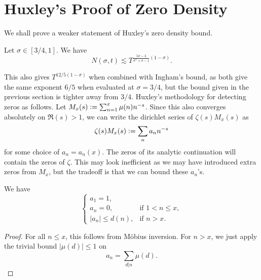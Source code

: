 \section{Huxley's Proof of Zero Density
}We shall prove a weaker statement of Huxley's zero density bound.
\begin{theorem}[Huxley]
    Let $\sigma\in[3/4,1]$. We have  \[
        N(\sigma,t)\lesssim T^{\frac{5\sigma-3}{\sigma^2+\sigma-1}(1-\sigma)}.
    \]
\end{theorem}
This also gives $T^{12/5(1-\sigma)}$ when combined with Ingham's bound, as both give the same exponent $6/5$ when evaluated at $\sigma=3/4$, but the bound given in the previous section is tighter away from $3/4$.
Huxley's methodology for detecting zeros as follows. Let $M_x(s) \mathrel{\mathop:}= \sum_{n=1}^{x} \mu(n)n^{-s}$. Since this also converges absolutely on $\Re(s)>1$, we can write the dirichlet series of $\zeta(s) M_x (s)$ as \[
    \zeta(s) M_x (s) \mathrel{\mathop:}= \sum_{n}a_n n^{-s}
\]
for some choice of $a_n=a_n(x)$. The zeros of its analytic continuation will contain the zeros of $\zeta$. This may look inefficient as we may have introduced extra zeros from $M_x$, but the tradeoff is that we can bound these $a_n$'s.
\begin{proposition}
    We have  \[\begin{cases}
        a_1 = 1, & \\
        a_n = 0, & \textrm{if $1<n\leq x$},\\
        |a_n|\leq d(n), & \textrm{if $n>x$}.
    \end{cases}\]
\end{proposition}
\begin{proof}
    For all $n\leq x$, this follows from M\"obius inversion. For $n>x$, we just apply the trivial bound $|\mu(d)|\leq 1$ on \[
    a_n  = \sum_{d|n} \mu(d) .
    \]
\end{proof}

